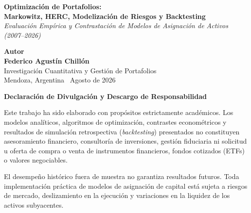 \documentclass[11pt,a4paper]{article}
\begin{document}
\begin{titlepage}
\thispagestyle{empty}
\centering
\vspace*{3.5cm}

{\LARGE \textbf{\color{navyblue}Optimización de Portafolios:\\[0.35cm] Markowitz, HERC, Modelización de Riesgos y Backtesting}}\\[0.8cm]

{\large \textit{\color{darkslate}Evaluación Empírica y Contrastación de Modelos de Asignación de Activos (2007--2026)}}\\[5.0cm]

\vfill

{\normalsize \textbf{Autor}}\\[0.2cm]
{\Large \textbf{\color{navyblue}Federico Agustín Chillón}}\\[0.4cm]
{\normalsize \color{darkslate}Investigación Cuantitativa y Gestión de Portafolios}\\[0.2cm]
{\small \color{darkslate}Mendoza, Argentina \textbar\ Agosto de 2026}
\vspace*{2.0cm}

\end{titlepage}

\newpage
\thispagestyle{empty}

\vspace*{2cm}
\begin{center}
{\large\bfseries\color{navyblue} Declaración de Divulgación y Descargo de Responsabilidad}
\end{center}
\vspace{0.4cm}

\begingroup
\setlength{\parindent}{0pt}
\small\color{darkslate}
Este trabajo ha sido elaborado con propósitos estrictamente académicos. Los modelos analíticos, algoritmos de optimización, contrastes econométricos y resultados de simulación retrospectiva (\textit{backtesting}) presentados no constituyen asesoramiento financiero, consultoría de inversiones, gestión fiduciaria ni solicitud u oferta de compra o venta de instrumentos financieros, fondos cotizados (ETFs) o valores negociables.

\vspace{0.4cm}
El desempeño histórico fuera de muestra no garantiza resultados futuros. Toda implementación práctica de modelos de asignación de capital está sujeta a riesgos de mercado, deslizamiento en la ejecución y variaciones en la liquidez de los activos subyacentes.
\endgroup
\end{document}

